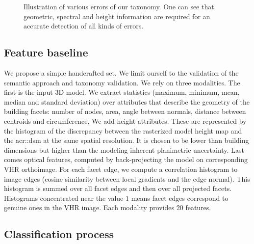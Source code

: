 \documentclass[conference]{IEEEtran}
\newcounter{SubFigCounter}
\begin{document}
\begin{figure}
\begin{center}
{{                }
                {
                    \renewcommand{\thesubfigure}{\roman{SubFigCounter}}
					\vspace{-.3cm}
                    \label{fig::fac_err}
                    \addtocounter{figure}{-1}
                }
            }
            {
                \caption{\label{fig::samples}Illustration of various errors of our taxonomy. One can see that geometric, spectral and height information are required for an accurate detection of all kinds of errors.}
            }
        \end{center}
    \end{figure}

\subsection{Feature baseline}

	We propose a simple handcrafted set. We limit ourself to the validation of the semantic approach and taxonomy validation. We rely on three modalities. The first is the input 3D model. We extract statistics (maximum, minimum, mean, median and standard deviation) over attributes that describe the geometry of the building facets: number of nodes, area, angle between normals, distance between centroids and circumference. We add height attributes. These are represented by the histogram of the discrepancy between the rasterized model height map and the \acrshort{acr::dsm} at the same spatial resolution. It is chosen to be lower than building dimensions but higher than the modeling inherent planimetric uncertainty. Last comes optical features, computed by back-projecting the model on corresponding VHR orthoimage. For each facet edge, we compute a correlation histogram to image edges (cosine similarity between local gradients and the edge normal). This histogram is summed over all facet edges and then over all projected facets. Histograms concentrated near the value $1$ means facet edges correspond to genuine ones in the VHR image. Each modality provides 20 features.

\subsection{Classification process}
\end{document}
